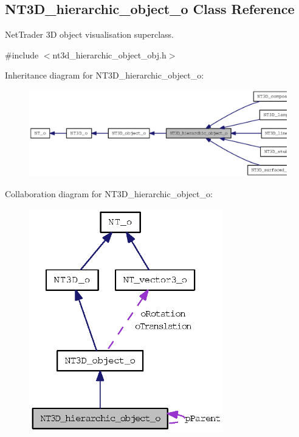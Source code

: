 \subsection{NT3D\_\-hierarchic\_\-object\_\-o Class Reference}
\label{class_n_t3_d__hierarchic__object__o}


NetTrader 3D object visualisation superclass.  




{\ttfamily \#include $<$nt3d\_\-hierarchic\_\-object\_\-obj.h$>$}



Inheritance diagram for NT3D\_\-hierarchic\_\-object\_\-o:
\nopagebreak
\begin{figure}[H]
\begin{center}
\leavevmode
\includegraphics[width=400pt]{class_n_t3_d__hierarchic__object__o__inherit__graph}
\end{center}
\end{figure}


Collaboration diagram for NT3D\_\-hierarchic\_\-object\_\-o:
\nopagebreak
\begin{figure}[H]
\begin{center}
\leavevmode
\includegraphics[width=239pt]{class_n_t3_d__hierarchic__object__o__coll__graph}
\end{center}
\end{figure}
